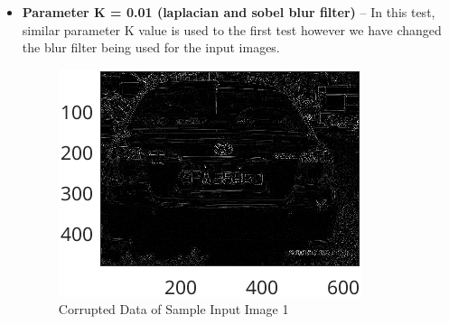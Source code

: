 \documentclass{article}
\begin{document}
\begin{itemize}
\begin{figure}[ht]
\begin{minipage}[t]{0.45\textwidth}
    			\caption{Deconvoled Sample Input Image 2}
    			\label{fig:deconv_e2_4}
  			\end{minipage}
			\end{figure}

			{Figure~\ref{fig:deconv_e1_4}} and {Figure~\ref{fig:deconv_e2_4}} skips the blurring process and directly undergo to the deblurring process. The output images do not resemble 
			the input images but instead they exhibit distortions resembling the visual effects associated with LSD usage.

		\item \textbf{Parameter K = 0.01 (laplacian and sobel blur filter)} – In this test, similar parameter K value is used to the first test however we have changed the blur filter being used for the input images.

  		\begin{figure}[ht]
  			\centering
  			\begin{minipage}[t]{0.45\textwidth}
    			\centering
    			\includegraphics[width=\textwidth]{2AE1Corrupted_laplacian}
    			\caption{Corrupted Data of Sample Input Image 1}
    			\label{fig:laplacian_cd}
  			\end{minipage}\hfill
  			\begin{minipage}[t]{0.45\textwidth}
    			\centering

\end{minipage}
\end{figure}
\end{itemize}
\end{document}
